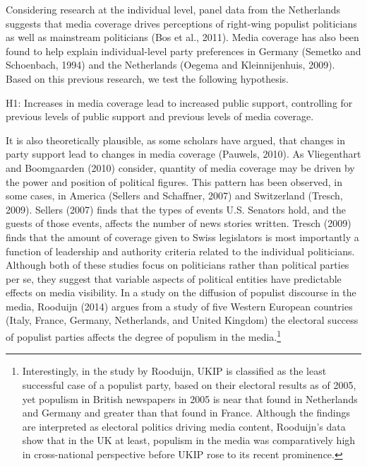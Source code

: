 \documentclass[12pt,article]{article}
\let\rmarkdownfootnote\footnote%
\def\footnote{\protect\rmarkdownfootnote}
\begin{document}
Considering research at the individual level, panel data from the
Netherlands suggests that media coverage drives perceptions of
right-wing populist politicians as well as mainstream politicians (Bos
et al., 2011). Media coverage has also been found to help explain
individual-level party preferences in Germany (Semetko and Schoenbach,
1994) and the Netherlands (Oegema and Kleinnijenhuis, 2009). Based on
this previous research, we test the following hypothesis.

H1: Increases in media coverage lead to increased public support,
controlling for previous levels of public support and previous levels of
media coverage.

It is also theoretically plausible, as some scholars have argued, that
changes in party support lead to changes in media coverage (Pauwels,
2010). As Vliegenthart and Boomgaarden (2010) consider, quantity of
media coverage may be driven by the power and position of political
figures. This pattern has been observed, in some cases, in America
(Sellers and Schaffner, 2007) and Switzerland (Tresch, 2009). Sellers
(2007) finds that the types of events U.S. Senators hold, and the guests
of those events, affects the number of news stories written. Tresch
(2009) finds that the amount of coverage given to Swiss legislators is
most importantly a function of leadership and authority criteria related
to the individual politicians. Although both of these studies focus on
politicians rather than political parties per se, they suggest that
variable aspects of political entities have predictable effects on media
visibility. In a study on the diffusion of populist discourse in the
media, Rooduijn (2014) argues from a study of five Western European
countries (Italy, France, Germany, Netherlands, and United Kingdom) the
electoral success of populist parties affects the degree of populism in
the
media.\footnote{Interestingly, in the study by Rooduijn, UKIP is classified as the least successful case of a populist party, based on their electoral results as of 2005, yet populism in British newspapers in 2005 is near that found in Netherlands and Germany and greater than that found in France. Although the findings are interpreted as electoral politics driving media content, Rooduijn's data show that in the UK at least, populism in the media was comparatively high in cross-national perspective before UKIP rose to its recent prominence.}
\end{document}
